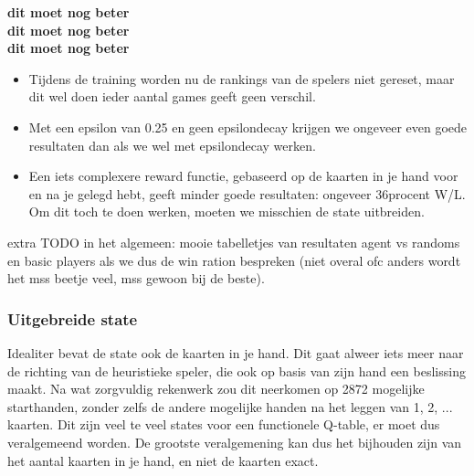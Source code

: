 \documentclass[11pt]{article}
\begin{document}
\textbf{dit moet nog beter}\\
\textbf{dit moet nog beter}\\
\textbf{dit moet nog beter}\\
\begin{itemize}
	\item Tijdens de training worden nu de rankings van de spelers niet gereset, maar dit wel doen ieder aantal games geeft geen verschil.
	\item Met een epsilon van 0.25 en geen epsilondecay krijgen we ongeveer even goede resultaten dan als we wel met epsilondecay werken.
	\item Een iets complexere reward functie, gebaseerd op de kaarten in je hand voor en na je gelegd hebt, geeft minder goede resultaten: ongeveer 36procent W/L. Om dit toch te doen werken, moeten we misschien de state uitbreiden.
\end{itemize}

 extra TODO in het algemeen: mooie tabelletjes van resultaten agent vs randoms en basic players als we dus de win ration bespreken (niet overal ofc anders wordt het mss beetje veel, mss gewoon bij de beste).



\subsubsection{Uitgebreide state}
Idealiter bevat de state ook de kaarten in je hand. Dit gaat alweer iets meer naar de richting van de heuristieke speler, die ook op basis van zijn hand een beslissing maakt. Na wat zorgvuldig rekenwerk zou dit neerkomen op 2872 mogelijke starthanden, zonder zelfs de andere mogelijke handen na het leggen van 1, 2, ... kaarten. Dit zijn veel te veel states voor een functionele Q-table, er moet dus veralgemeend worden. De grootste veralgemening kan dus het bijhouden zijn van het aantal kaarten in je hand, en niet de kaarten exact.\\\\
\end{document}
